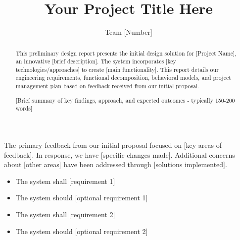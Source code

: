 \documentclass[final]{designreport}
\title{Your Project Title Here}
\author{Team [Number]}
\begin{document}
\maketitle

\makefrontmatter

\begin{abstract}
This preliminary design report presents the initial design solution for [Project Name], an innovative [brief description]. The system incorporates [key technologies/approaches] to create [main functionality]. This report details our engineering requirements, functional decomposition, behavioral models, and project management plan based on feedback received from our initial proposal.

[Brief summary of key findings, approach, and expected outcomes - typically 150-200 words]
\end{abstract}

\commentresponse
The primary feedback from our initial proposal focused on [key areas of feedback]. In response, we have [specific changes made]. Additional concerns about [other areas] have been addressed through [solutions implemented].




\requirementsspec

\marketingreqs
\begin{itemize}
    \item The system shall [requirement 1]
    \item The system should [optional requirement 1]
    \item The system shall [requirement 2]
    \item The system should [optional requirement 2]
\end{itemize}

\end{document}
